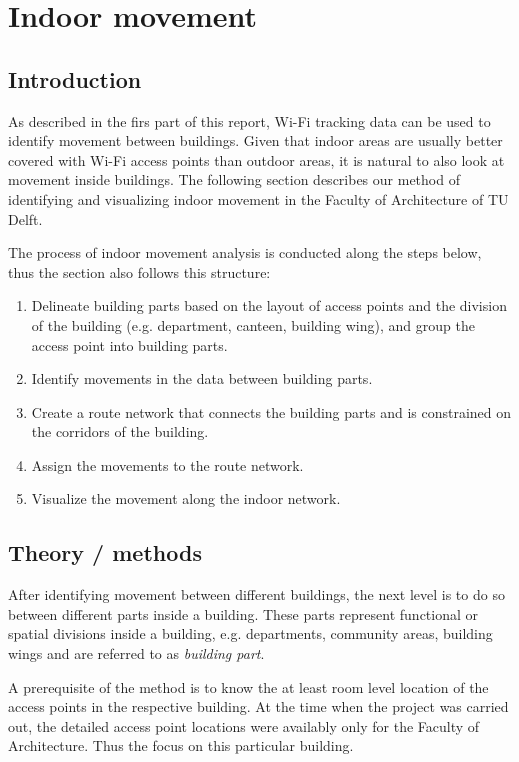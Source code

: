 \chapter{Indoor movement}\label{indoormovement}
\section{Introduction}
As described in the firs part of this report, Wi-Fi tracking data can be used to
identify movement between buildings. Given that indoor areas are usually better
covered with Wi-Fi access points than outdoor areas, it is natural to also look
at movement inside buildings. The following section describes our method of
identifying and visualizing indoor movement in the Faculty of Architecture of TU
Delft.

The process of indoor movement analysis is conducted along the steps below,
thus the section also follows this structure:

\begin{enumerate}
    \item Delineate building parts based on the layout of access points
and the division of the building (e.g. department, canteen, building wing), and
group the access point into building parts.
    \item Identify movements in the data between building parts.
    \item Create a route network that connects the building parts and
    is constrained on the corridors of the building.
    \item Assign the movements to the route network.
    \item Visualize the movement along the indoor network.
\end{enumerate}

\section{Theory / methods}\label{11methods}
After identifying movement between different buildings, the next level is to do
so between different parts inside a building. These parts represent
functional or spatial divisions inside a building, e.g. departments, community
areas, building wings and are referred to as \textit{building part}.

A prerequisite of the method is to know the at least room level location of the
access points in the respective building. At the time when the project
was carried out, the detailed access point locations were availably only for the
Faculty of Architecture. Thus the focus on this particular building.

